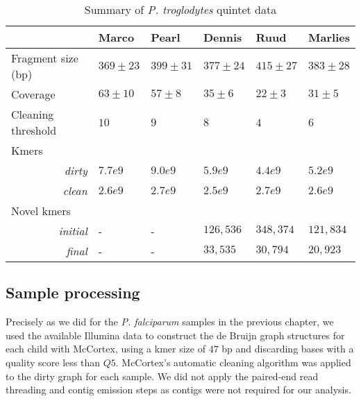 \begin{table}[]
\centering
\caption{Summary of \textit{P. troglodytes} quintet data}
\label{tbl:pedstats}
\begin{tabular}{@{}llllll@{}}
\toprule
                                       & Marco           & Pearl           & Dennis         & Ruud            & Marlies         \\ \midrule
Fragment size (bp)                     & $369 \pm 23$    & $399 \pm 31$    & $377 \pm 24$   & $415 \pm 27$    & $383 \pm 28$    \\
Coverage                               & $63 \pm 10$     & $57 \pm 8$      & $35 \pm 6$     & $22 \pm 3$      & $31 \pm 5$      \\
Cleaning threshold                     & $10$            & $9$             & $8$            & $4$             & $6$             \\
Kmers                                  &                 &                 &                &                 &                 \\
\multicolumn{1}{r}{\textit{dirty}}     & $7.7e9$         & $9.0e9$         & $5.9e9$        & $4.4e9$         & $5.2e9$         \\
\multicolumn{1}{r}{\textit{clean}}     & $2.6e9$         & $2.7e9$         & $2.5e9$        & $2.7e9$         & $2.6e9$         \\
Novel kmers                            &                 &                 &                &                 &                 \\
\multicolumn{1}{r}{\textit{initial}}   & -               & -               & $126,536$      & $348,374$       & $121,834$       \\
\multicolumn{1}{r}{\textit{final}}     & -               & -               & $33,535$       & $30,794$        & $20,923$        \\ \bottomrule
\end{tabular}
\end{table}

\subsection{Sample processing}

Precisely as we did for the \textit{P. falciparum} samples in the previous chapter, we used the available Illumina data to construct the de Bruijn graph structures for each child with McCortex, using a kmer size of $47$ bp and discarding bases with a quality score less than $Q5$.  McCortex's automatic cleaning algorithm was applied to the dirty graph for each sample.  We did not apply the paired-end read threading and contig emission steps as contigs were not required for our analysis.

